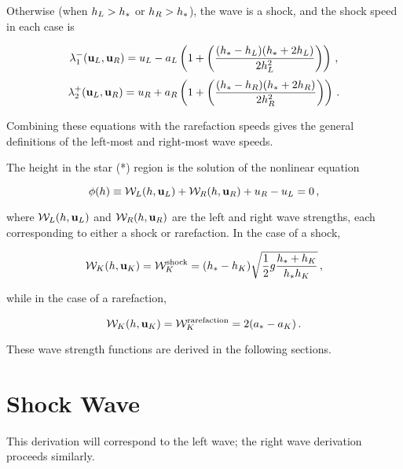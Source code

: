 Otherwise (when $h_L > h_*$ or $h_R > h_*$), the
wave is a shock, and the shock speed in each case is

\begin{equation}
  \lambda_1^-(\mathbf{u}_L, \mathbf{u}_R)
    = u_L - a_L\left(1 + \left(
    \frac{(h_* - h_L)(h_* + 2h_L)}{2h_L^2}\right)\right)
    \,,
\end{equation}
\begin{equation}
  \lambda_2^+(\mathbf{u}_L, \mathbf{u}_R)
    = u_R + a_R\left(1 + \left(
    \frac{(h_* - h_R)(h_* + 2h_R)}{2h_R^2}\right)\right)
    \,.
\end{equation}

Combining these equations with the rarefaction speeds gives the general
definitions of the left-most and right-most wave speeds.

The height in the star (*) region is the solution of the nonlinear equation

\begin{equation}
  \phi(h) \equiv
    \mathcal{W}_L(h,\mathbf{u}_L)
    + \mathcal{W}_R(h,\mathbf{u}_R)
    + u_R - u_L
    = 0 \,,
\end{equation}

where $\mathcal{W}_L(h,\mathbf{u}_L)$ and
$\mathcal{W}_R(h,\mathbf{u}_R)$
are the left and right wave strengths, each corresponding to either a shock
or rarefaction. In the case of a shock,

\begin{equation}
  \mathcal{W}_K(h,\mathbf{u}_K) = \mathcal{W}_K^{\text{shock}} = 
    (h_* - h_K)\sqrt{\frac{1}{2}g\frac{h_* + h_K}
    {h_*h_K}}
    \,,
\end{equation}

while in the case of a rarefaction,

\begin{equation}
  \mathcal{W}_K(h,\mathbf{u}_K) = \mathcal{W}_K^{\text{rarefaction}} = 
    2(a_* - a_K)
    \,.
\end{equation}

These wave strength functions are derived in the following sections.

\section{Shock Wave}
This derivation will correspond to the left wave; the right wave derivation
proceeds similarly.

